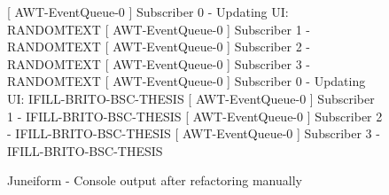 \begin{figure}[H]
\begin{sourcecode}
\begin{textcode}{}
[ AWT-EventQueue-0 ] Subscriber 0 - Updating UI: RANDOMTEXT
[ AWT-EventQueue-0 ] Subscriber 1 - RANDOMTEXT
[ AWT-EventQueue-0 ] Subscriber 2 - RANDOMTEXT
[ AWT-EventQueue-0 ] Subscriber 3 - RANDOMTEXT
[ AWT-EventQueue-0 ] Subscriber 0 - Updating UI: IFILL-BRITO-BSC-THESIS
[ AWT-EventQueue-0 ] Subscriber 1 - IFILL-BRITO-BSC-THESIS
[ AWT-EventQueue-0 ] Subscriber 2 - IFILL-BRITO-BSC-THESIS
[ AWT-EventQueue-0 ] Subscriber 3 - IFILL-BRITO-BSC-THESIS
\end{textcode}
\caption{Juneiform - Console output after refactoring manually}
\label{code:example-console}
\end{sourcecode}
\end{figure}